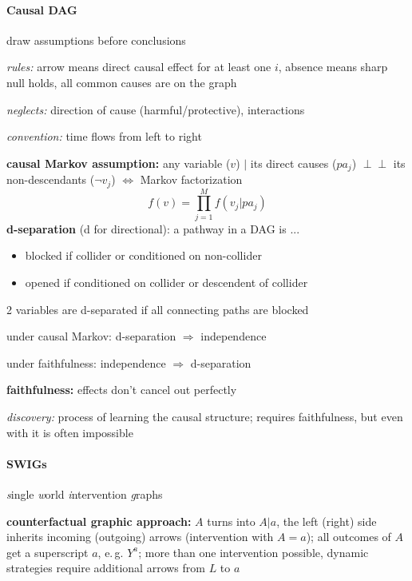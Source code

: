 \documentclass[8pt,oneside]{extarticle}
\newcommand{\indep}{\perp \!\!\! \perp}
\begin{document}
\begin{multicols}{2}
\paragraph{\large Causal DAG} draw assumptions before conclusions


\noindent \textit{rules:}
arrow means direct causal effect for at least one $i$, absence means sharp null holds, all common causes are on the graph


\noindent \textit{neglects:} direction of cause (harmful/protective), interactions

\noindent \textit{convention:} time flows from left to right


\noindent \textbf{causal Markov assumption:} any variable ($v$) $|$ its direct causes ($pa_j$) $\indep$ its non-descendants ($\lnot v_j$) $\Leftrightarrow$ Markov factorization $$f(v) = \textstyle\prod_{j=1}^Mf(v_j|pa_j)$$
\noindent \textbf{d-separation} (d for directional): a pathway in a DAG is ...
\begin{itemize}[itemsep=0em, topsep=0pt, partopsep=0pt,parsep=0pt, leftmargin=1.5em]
\setlength{\itemsep}{0pt}%
\setlength{\parskip}{0pt}
\item blocked if collider or conditioned on non-collider
\item opened if conditioned on collider or descendent of collider
\end{itemize}
2 variables are d-separated if all connecting paths are blocked

\noindent under causal Markov: d-separation $\Rightarrow$ independence

\noindent under faithfulness: independence $\Rightarrow$ d-separation

\noindent \textbf{faithfulness:} effects don't cancel out perfectly

\noindent \textit{discovery:} process of learning the causal structure; requires faithfulness, but even with it is often impossible







\paragraph{\large SWIGs} \textit{s}ingle \textit{w}orld \textit{i}ntervention \textit{g}raphs

\noindent \textbf{counterfactual graphic approach:}
$A$ turns into $A|a$, the left (right) side inherits incoming (outgoing) arrows (intervention with $A=a$); all outcomes of $A$ get a superscript $a$, e.\,g. $Y^a$; more than one intervention possible, dynamic strategies require additional arrows from $L$ to $a$



\end{multicols}
\end{document}
